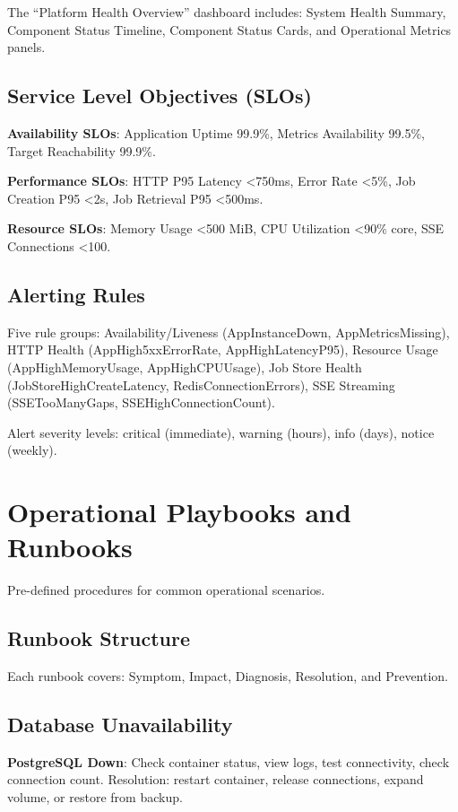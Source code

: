 \documentclass[a4paper,twoside]{sapthesis}
\begin{document}
The ``Platform Health Overview'' dashboard includes: System Health Summary, Component Status Timeline, Component Status Cards, and Operational Metrics panels.

\subsection{Service Level Objectives (SLOs)}

\textbf{Availability SLOs}: Application Uptime 99.9\%, Metrics Availability 99.5\%, Target Reachability 99.9\%.

\textbf{Performance SLOs}: HTTP P95 Latency <750ms, Error Rate <5\%, Job Creation P95 <2s, Job Retrieval P95 <500ms.

\textbf{Resource SLOs}: Memory Usage <500 MiB, CPU Utilization <90\% core, SSE Connections <100.

\subsection{Alerting Rules}

Five rule groups: Availability/Liveness (AppInstanceDown, AppMetricsMissing), HTTP Health (AppHigh5xxErrorRate, AppHighLatencyP95), Resource Usage (AppHighMemoryUsage, AppHighCPUUsage), Job Store Health (JobStoreHighCreateLatency, RedisConnectionErrors), SSE Streaming (SSETooManyGaps, SSEHighConnectionCount).

Alert severity levels: critical (immediate), warning (hours), info (days), notice (weekly).

\section{Operational Playbooks and Runbooks}
\label{sec:runbooks}

Pre-defined procedures for common operational scenarios.

\subsection{Runbook Structure}

Each runbook covers: Symptom, Impact, Diagnosis, Resolution, and Prevention.

\subsection{Database Unavailability}

\textbf{PostgreSQL Down}: Check container status, view logs, test connectivity, check connection count. Resolution: restart container, release connections, expand volume, or restore from backup.
\end{document}
